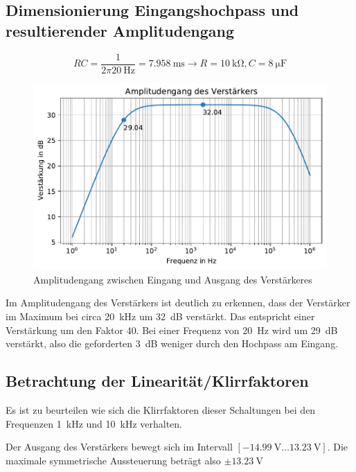\subsection{Dimensionierung Eingangshochpass und resultierender Amplitudengang}



\begin{equation}
    RC = \frac{1}{2 \pi \SI{20}{\hertz}} = \SI{7.958}{\milli \second} \rightarrow R = \SI{10}{\kilo \ohm}, C = \SI{8}{\micro \farad}
\end{equation}

\begin{figure}[H]
    \centering
    \includegraphics{tex/7_Leistungsverstaerker/pictures/Amplitudengang.pdf}
    \caption{Amplitudengang zwischen Eingang und Ausgang des Verstärkeres}
    \label{fig:my_label}
\end{figure}

Im Amplitudengang des Verstärkers ist deutlich zu erkennen, dass der Verstärker im Maximum bei circa \SI{20}{\kilo \hertz} um \SI{32}{dB} verstärkt. Das entspricht einer Verstärkung um den Faktor 40.
Bei einer Frequenz von \SI{20}{\hertz} wird um \SI{29}{dB} verstärkt, also die geforderten \SI{3}{dB} weniger durch den Hochpass am Eingang.

\subsection{Betrachtung der Linearität/Klirrfaktoren}

Es ist zu beurteilen wie sich die Klirrfaktoren dieser Schaltungen bei den Frequenzen \SI{1}{\kilo \hertz} und \SI{10}{\kilo \hertz} verhalten.

Der Ausgang des Verstärkers bewegt sich im Intervall $\left[\SI{-14.99}{\volt} \ldots \SI{13.23}{\volt}\right]$. Die maximale symmetrische Aussteuerung beträgt also $\pm \SI{13.23}{\volt}$

